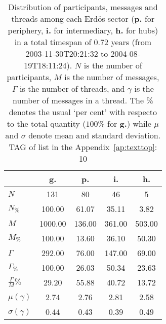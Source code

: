 \begin{table}[h!]
\begin{center}
\begin{tabular}{| l || c | c | c | c |}\hline
 & {\bf g.} & {\bf p.} & {\bf i.} & {\bf h.} \\\hline\hline
$N$ & 131  & 80  & 46  & 5 \\
$N_{\%}$ & 100.00  & 61.07  & 35.11  & 3.82 \\\hline
$M$ & 1000.00  & 136.00  & 361.00  & 503.00 \\
$M_{\%}$ & 100.00  & 13.60  & 36.10  & 50.30 \\\hline
$\Gamma$ & 292.00  & 76.00  & 147.00  & 69.00 \\
$\Gamma_{\%}$ & 100.00  & 26.03  & 50.34  & 23.63 \\\hline
$\frac{\Gamma}{M}\%$ & 29.20  & 55.88  & 40.72  & 13.72 \\
$\mu(\gamma)$ & 2.74  & 2.76  & 2.81  & 2.58 \\
$\sigma(\gamma)$ & 0.44  & 0.43  & 0.39  & 0.49 \\\hline
\end{tabular}
\caption{Distribution of participants, messages and threads among each Erd\"os sector ({\bf p.} for periphery, {\bf i.} for intermediary, 
    {\bf h.} for hubs) in a total timespan of 0.72 years (from 2003-11-30T20:21:32 to 2004-08-19T18:11:24). $N$ is the number of participants, $M$ is the number of messages, $\Gamma$ is the number of threads, and $\gamma$ is the number of messages in a thread.
    The \% denotes the usual `per cent' with respecto to the total quantity ($100\%$ for {\bf g.})
    while $\mu$ and $\sigma$ denote mean and standard deviation. TAG of list in the Appendix~\ref{ap:texttop}: 10}\label{geralListas}    
\end{center}
\end{table}
